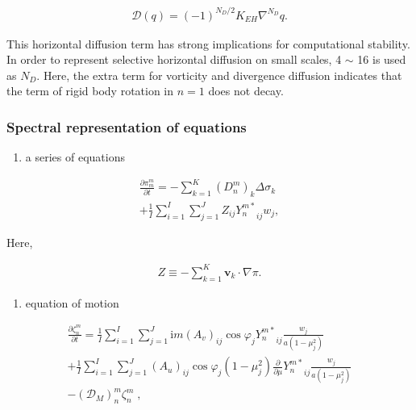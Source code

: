 \begin{eqnarray}
    {\mathcal D}(q) = (-1)^{N_D/2} K_{EH} \nabla^{N_D} q .
\end{eqnarray}

This horizontal diffusion term has strong implications for computational
stability. In order to represent selective horizontal diffusion on small
scales, 4 \(\sim\) 16 is used as \(N_D\). Here, the extra term for
vorticity and divergence diffusion indicates that the term of rigid body
rotation in \(n=1\) does not decay.

\hypertarget{spectral-representation-of-equations}{%
\subsubsection{Spectral representation of
equations}\label{spectral-representation-of-equations}}

\begin{enumerate}
\def\labelenumi{\arabic{enumi}.}
\tightlist
\item
  a series of equations
\end{enumerate}

\begin{eqnarray}
  \frac{\partial{\pi_m^m}}{\partial {t}}
  =  - \sum_{k=1}^{K} (D_n^m)_k \Delta  \sigma_k  \\
     + \frac{1}{I} \sum_{i=1}^{I} \sum_{j=1}^{J}  
               Z_{ij} {Y_n^{m *}}_{ij} w_j  ,
\end{eqnarray}

Here,

\begin{eqnarray}
Z \equiv - \sum_{k=1}^{K} \mathbf{v}_k \cdot \nabla \pi .
\end{eqnarray}

\begin{enumerate}
\def\labelenumi{\arabic{enumi}.}
\setcounter{enumi}{1}
\tightlist
\item
  equation of motion
\end{enumerate}

\begin{eqnarray}
  \frac{\partial{\zeta_n^m}}{\partial {t}} 
    =  \frac{1}{I} \sum_{i=1}^{I} \sum_{j=1}^{J}  
          \mathrm{i}m (A_v)_{ij} \cos\varphi_j
          {Y_n^{m *}}_{ij}
         \frac{w_j}{a(1-\mu_j^{2})} 
         \\
    +    \frac{1}{I} \sum_{i=1}^{I} \sum_{j=1}^{J}  
          (A_u)_{ij} \cos\varphi_j
          (1-\mu_j^2) 
          \frac{\partial }{\partial \mu} {Y_n^{m *}}_{ij}
          \frac{w_j}{a(1-\mu_j^{2})} 
          \\ 
    -   ({\mathcal D}_M)_n^m \zeta_n^m  \; ,
\end{eqnarray}

